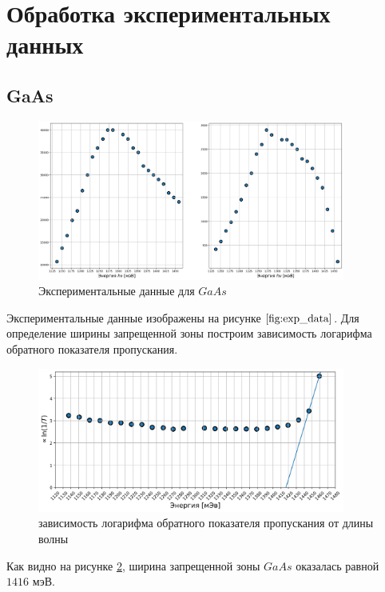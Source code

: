 \documentclass[a4paper, 12pt]{extarticle}
\begin{document}
\section*{\textcolor{header}{Обработка экспериментальных данных}}

\subsection*{\textcolor{sub_header}{GaAs}}

\begin{figure}[htbp]
    \centering
    \includegraphics*[width = 0.9\textwidth]{raw.png}
    \caption{Экспериментальные данные для $GaAs$}
    \label{fig:exp_data}
\end{figure}

Экспериментальные данные изображены на рисунке $\ref{fig:exp_data}$. Для определение ширины запрещенной зоны построим зависимость логарифма обратного показателя пропускания.
\begin{figure}[htbp]
    \centering
    \includegraphics*[width = 0.9\textwidth]{main.png}
    \caption{зависимость логарифма обратного показателя пропускания от длины волны}
    \label{fig:GaAs}
\end{figure}

Как видно на рисунке \ref{fig:GaAs}, ширина запрещенной зоны $GaAs$ оказалась равной $1416 \text{ мэВ}$.
\end{document}
